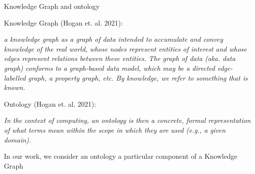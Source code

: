 \begin{frame}{Knowledge Graph and ontology}

    Knowledge Graph (Hogan et. al. 2021):
    \begin{center}
        \emph{a knowledge graph as a graph of data intended to accumulate and convey knowledge of the real world, whose nodes represent entities of interest and whose edges represent relations between these entities. The graph of data (aka. data graph) conforms to a graph-based data model, which may be a directed edge-labelled graph, a property graph, etc. By knowledge, we refer to something that is known.}
    \end{center}

    Ontology (Hogan et. al. 2021):
    \begin{center}
        \emph{In the context of computing, an ontology is then a concrete, formal representation of what terms mean within the scope in which they are used (e.g., a given domain).}
    \end{center}

    In our work, we consider an ontology a particular component of a Knowledge Graph
    
\end{frame}